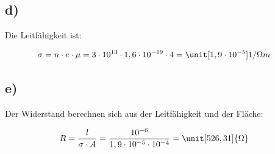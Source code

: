 \subsection*{d)}


Die Leitfähigkeit ist:

\begin{align*}
\sigma &= n \cdot e \cdot \mu = 3 \cdot 10^{13} \cdot 1,6 \cdot 10^{-19} \cdot 4 = \unit[1,9 \cdot 10^{-5}]{1/ \Omega m}
\end{align*}


\subsection*{e)}

Der Widerstand berechnen sich aus der Leitfähigkeit und der Fläche:

\begin{align*}
R &= \frac{l}{\sigma \cdot A} = \frac{10^{-6}}{1,9 \cdot 10^{-5} \cdot 10^{-4}} = \unit[526,31]{\Omega}
\end{align*}




























